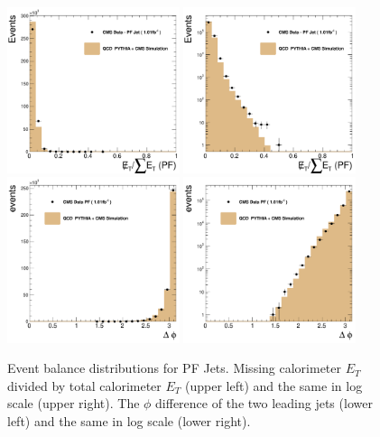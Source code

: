 \begin{figure}[!ht]
  \begin{center}
   \includegraphics[width=0.45\textwidth]{Figures/c_MET_over_sumEt_pf.pdf}
   \includegraphics[width=0.45\textwidth]{Figures/c_MET_over_sumEt_pf_log.pdf}
   \includegraphics[width=0.45\textwidth]{Figures/c_DPhi_pf.pdf}
   \includegraphics[width=0.45\textwidth]{Figures/c_DPhi_pf_log.pdf}

   \caption{ Event balance distributions for PF Jets.  Missing
    calorimeter $E_T$ divided by total calorimeter $E_T$ 
    (upper left) and the same in log scale (upper right).
    The $\phi$ difference of the two leading jets (lower left) 
    and the same in log scale (lower right).}
    \label{basic_event_pf}
  \end{center}
\end{figure}

